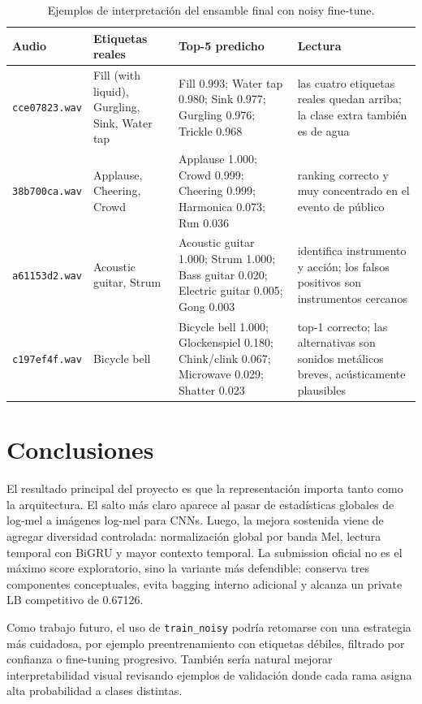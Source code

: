 \documentclass[10pt]{article}
\begin{document}
\begin{table}[H]
\centering
\scriptsize
\begin{tabularx}{\textwidth}{@{}lX X X@{}}
\toprule
Audio & Etiquetas reales & Top-5 predicho & Lectura \\
\midrule
\texttt{cce07823.wav} &
Fill (with liquid), Gurgling, Sink, Water tap &
Fill 0.993; Water tap 0.980; Sink 0.977; Gurgling 0.976; Trickle 0.968 &
las cuatro etiquetas reales quedan arriba; la clase extra también es de agua \\
\texttt{38b700ca.wav} &
Applause, Cheering, Crowd &
Applause 1.000; Crowd 0.999; Cheering 0.999; Harmonica 0.073; Run 0.036 &
ranking correcto y muy concentrado en el evento de público \\
\texttt{a61153d2.wav} &
Acoustic guitar, Strum &
Acoustic guitar 1.000; Strum 1.000; Bass guitar 0.020; Electric guitar 0.005; Gong 0.003 &
identifica instrumento y acción; los falsos positivos son instrumentos cercanos \\
\texttt{c197ef4f.wav} &
Bicycle bell &
Bicycle bell 1.000; Glockenspiel 0.180; Chink/clink 0.067; Microwave 0.029; Shatter 0.023 &
top-1 correcto; las alternativas son sonidos metálicos breves, acústicamente plausibles \\
\bottomrule
\end{tabularx}
\caption{Ejemplos de interpretación del ensamble final con noisy fine-tune.}
\label{tab:interpretacion}
\end{table}

\section{Conclusiones}
El resultado principal del proyecto es que la representación importa tanto como
la arquitectura. El salto más claro aparece al pasar de estadísticas globales de
log-mel a imágenes log-mel para CNNs. Luego, la mejora sostenida viene de
agregar diversidad controlada: normalización global por banda Mel, lectura
temporal con BiGRU y mayor contexto temporal. La submission oficial no es el
máximo score exploratorio, sino la variante más defendible: conserva tres
componentes conceptuales, evita bagging interno adicional y alcanza un private
LB competitivo de 0.67126.

Como trabajo futuro, el uso de \texttt{train\_noisy} podría retomarse con una
estrategia más cuidadosa, por ejemplo preentrenamiento con etiquetas débiles,
filtrado por confianza o fine-tuning progresivo. También sería natural mejorar
interpretabilidad visual revisando ejemplos de validación donde cada rama
asigna alta probabilidad a clases distintas.
\end{document}
